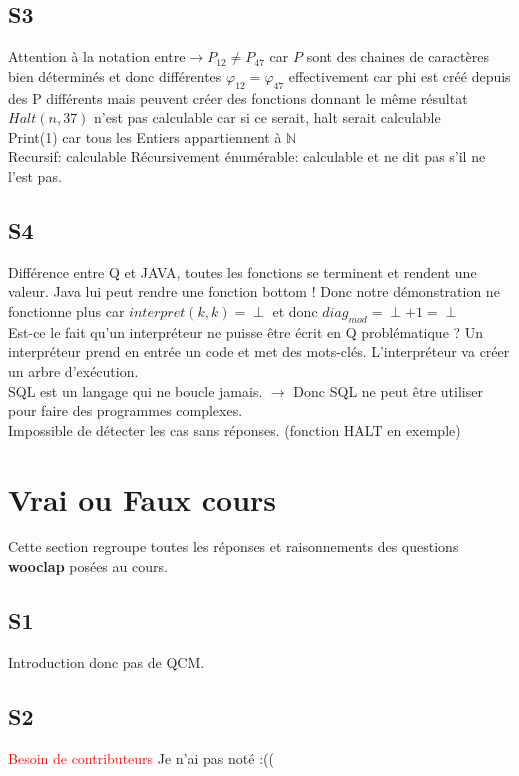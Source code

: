\documentclass{report}
\begin{document}
\section{S3}
Attention à la notation entre$ \rightarrow P_{12} \neq P_{47}$ car $P$ sont des chaines de caractères bien déterminés et donc différentes
$\varphi_{12}=\varphi_{47}$ effectivement car phi est créé depuis des P différents mais peuvent créer des fonctions donnant le même résultat\\

$Halt(n,37)$ n'est pas calculable car si ce serait, halt serait calculable\\
Print(1) car tous les Entiers appartiennent à $\mathbb{N}$\\

Recursif: calculable
Récursivement énumérable: calculable et ne dit pas s'il ne l'est pas.

\section{S4}
Différence entre Q et JAVA, toutes les fonctions se terminent et rendent une valeur. 
Java lui peut rendre une fonction bottom !
Donc notre démonstration ne fonctionne plus car $interpret(k,k)= \perp$ et donc $diag_{mod}= \perp+1= \perp$\\

Est-ce le fait qu'un interpréteur ne puisse être écrit en Q problématique ?
Un interpréteur prend en entrée un code et met des mots-clés. L'interpréteur va créer un arbre d'exécution.\\
SQL est un langage qui ne boucle jamais. $\rightarrow$ Donc SQL ne peut être utiliser pour faire des programmes complexes.\\

Impossible de détecter les cas sans réponses. (fonction HALT en exemple)

\chapter{Vrai ou Faux cours} %
Cette section regroupe toutes les réponses et raisonnements des questions \textbf{wooclap} posées au cours.

\section{S1}
Introduction donc pas de QCM.

\section{S2}
\textcolor{red}{Besoin de contributeurs}
Je n'ai pas noté :(( 
\end{document}

